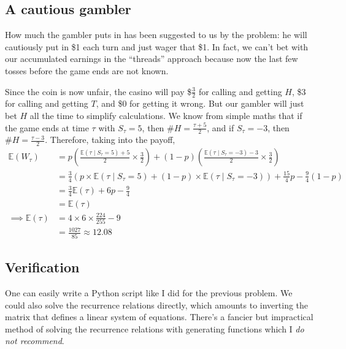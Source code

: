 \documentclass[11pt]{article}
\newcommand{\E}{\mathbb{E}}
\begin{document}
\subsection{A cautious gambler}
How much the gambler puts in has been suggested to us by the problem: he will cautiously put in \$1 each turn and just wager that \$1. In fact, we can't bet with our accumulated earnings in the ``threads'' approach because now the last few tosses before the game ends are not known. 

Since the coin is now unfair, the casino will pay \$$\frac{3}{2}$ for calling and getting $H$, \$3 for calling and getting $T$, and \$0 for getting it wrong. But our gambler will just bet $H$ all the time to simplify calculations. We know from simple maths that if the game ends at time $\tau$ with $S_\tau = 5$, then $\#H = \frac{\tau+5}{2}$, and if $S_\tau = -3$, then $\#H = \frac{\tau-3}{2}$. Therefore, taking into the payoff,
\begin{align*}
\E(W_\tau) &= p\left(\frac{\E(\tau\mid S_\tau=5)+5}{2} \times \frac{3}{2}\right) + (1-p)\left(\frac{\E(\tau\mid S_\tau=-3)-3}{2} \times \frac{3}{2}\right) \\
&= \frac{3}{4}\left(p\times\E(\tau\mid S_\tau=5) + (1-p)\times\E(\tau\mid S_\tau=-3)\right) + \frac{15}{4}p - \frac{9}{4} (1-p) \\
&= \frac{3}{4}\E(\tau) + 6p - \frac{9}{4} \\
&= \E(\tau) \\
\implies \E(\tau) &= 4 \times 6 \times \frac{224}{255} - 9 \\
&= \boxed{\frac{1027}{85}} \approx 12.08
\end{align*}


\subsection{Verification}
One can easily write a Python script like I did for the previous problem. We could also solve the recurrence relations directly, which amounts to inverting the matrix that defines a linear system of equations. There's a fancier but impractical method of solving the recurrence relations with generating functions \cite{wilf2014generatingfunctionology} which I \emph{do not recommend}.

\newpage
\printbibliography
\end{document}
